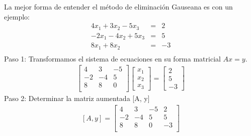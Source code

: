 \documentclass[letterpaper,10pt,english]{jupyterBook}
\begin{document}
\sphinxAtStartPar
La mejor forma de entender el método de eliminación Gauseana es con un ejemplo:
\begin{eqnarray*}
4x_1 + 3x_2 - 5x_3 &=& 2 \\
-2x_1 - 4x_2 + 5x_3 &=& 5 \\
8x_1 + 8x_2  &=& -3 \\
\end{eqnarray*}
\sphinxAtStartPar
Paso 1: Transformamos el sistema de ecuaciones en su forma matricial \(Ax=y\).
\begin{equation*}
\begin{split}
\begin{bmatrix}
4 & 3 & -5\\
-2 & -4 & 5\\
8 & 8 & 0\\
\end{bmatrix}\left[\begin{array}{c} x_1 \\x_2 \\x_3 \end{array}\right] =
\left[\begin{array}{c} 2 \\5 \\-3\end{array}\right]\end{split}
\end{equation*}
\sphinxAtStartPar
Paso 2: Determinar la matriz aumentada {[}A, y{]}
\begin{equation*}
\begin{split}
[A, y]  = \begin{bmatrix}
4 & 3 & -5 & 2\\
-2 & -4 & 5 & 5\\
8 & 8 & 0 & -3\\
\end{bmatrix}\end{split}
\end{equation*}
\end{document}
